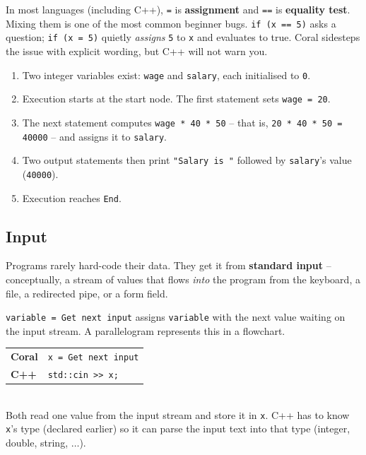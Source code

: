 \documentclass[11pt]{article}
\begin{document}
\begin{warnbox}[\texttt{=} vs.\ \texttt{==}]
In most languages (including C++), \texttt{=} is \textbf{assignment} and
\texttt{==} is \textbf{equality test}. Mixing them is one of the most common
beginner bugs. \texttt{if (x == 5)} asks a question; \texttt{if (x = 5)}
quietly \emph{assigns} \texttt{5} to \texttt{x} and evaluates to true. Coral
sidesteps the issue with explicit wording, but C++ will not warn you.
\end{warnbox}

\begin{examplebox}
\begin{enumerate}
    \item Two integer variables exist: \texttt{wage} and \texttt{salary},
          each initialised to \texttt{0}.
    \item Execution starts at the start node. The first statement sets
          \texttt{wage = 20}.
    \item The next statement computes \texttt{wage * 40 * 50} -- that is,
          \texttt{20 * 40 * 50 = 40000} -- and assigns it to \texttt{salary}.
    \item Two output statements then print \texttt{"Salary is "} followed by
          \texttt{salary}'s value (\texttt{40000}).
    \item Execution reaches \texttt{End}.
\end{enumerate}
\end{examplebox}

\subsection{Input}

Programs rarely hard-code their data. They get it from \textbf{standard
input} -- conceptually, a stream of values that flows \emph{into} the program
from the keyboard, a file, a redirected pipe, or a form field.

\begin{defnbox}
\texttt{variable = Get next input} assigns \texttt{variable} with the next
value waiting on the input stream. A parallelogram represents this in a
flowchart.
\end{defnbox}

\begin{examplebox}
\begin{tabular}{ll}
\textbf{Coral} & \texttt{x = Get next input} \\
\textbf{C++}   & \texttt{std::cin >> x;} \\
\end{tabular}\\[4pt]
Both read one value from the input stream and store it in \texttt{x}. C++
has to know \texttt{x}'s type (declared earlier) so it can parse the input
text into that type (integer, double, string, $\ldots$).
\end{examplebox}
\end{document}
